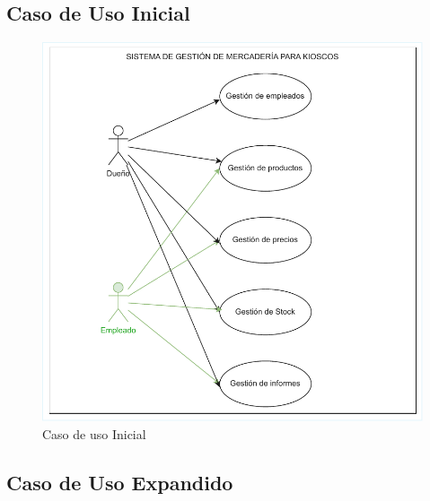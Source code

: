\documentclass[twoside]{article}
\begin{document}
\subsection{Caso de Uso Inicial}
\begin{figure}[!h]
    \centering
    \includegraphics[scale=0.95]{casodeusoini.pdf}
    \caption{Caso de uso Inicial}
    \label{fig:enter-label}
\end{figure}

\newpage
\subsection{Caso de Uso Expandido}
\end{document}
